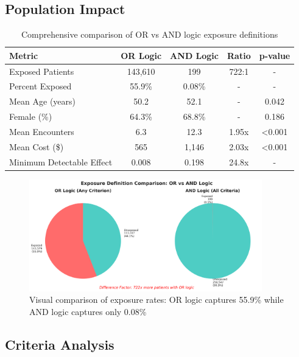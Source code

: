 \documentclass[11pt]{article}
\begin{document}
\subsection{Population Impact}

\begin{table}[H]
\centering
\begin{tabular}{lcccc}
\toprule
\textbf{Metric} & \textbf{OR Logic} & \textbf{AND Logic} & \textbf{Ratio} & \textbf{p-value} \\
\midrule
Exposed Patients & 143,610 & 199 & 722:1 & - \\
Percent Exposed & 55.9\% & 0.08\% & - & - \\
Mean Age (years) & 50.2 & 52.1 & - & 0.042 \\
Female (\%) & 64.3\% & 68.8\% & - & 0.186 \\
Mean Encounters & 6.3 & 12.3 & 1.95x & <0.001 \\
Mean Cost (\$) & 565 & 1,146 & 2.03x & <0.001 \\
Minimum Detectable Effect & 0.008 & 0.198 & 24.8x & - \\
\bottomrule
\end{tabular}
\caption{Comprehensive comparison of OR vs AND logic exposure definitions}
\label{tab:exposure_comparison}
\end{table}

\begin{figure}[H]
\centering
\includegraphics[width=0.9\textwidth]{analysis/exposure_validation_enhanced/exposure_comparison.png}
\caption{Visual comparison of exposure rates: OR logic captures 55.9\% while AND logic captures only 0.08\%}
\label{fig:exposure_comparison}
\end{figure}

\subsection{Criteria Analysis}
\end{document}

